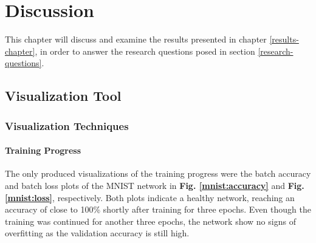 
\chapter{Discussion} \label{discussion-chapter}

This chapter will discuss and examine the results presented in chapter \ref{results-chapter}, in order to answer the research questions posed in section \ref{research-questions}.

\section{Visualization Tool}






\subsection{Visualization Techniques}


\subsubsection{Training Progress}

The only produced visualizations of the training progress were the batch accuracy and batch loss plots of the MNIST network in \textbf{Fig. \ref{mnist:accuracy}} and \textbf{Fig. \ref{mnist:loss}}, respectively. Both plots indicate a healthy network, reaching an accuracy of close to 100\% shortly after training for three epochs. Even though the training was continued for another three epochs, the network show no signs of overfitting as the validation accuracy is still high.

